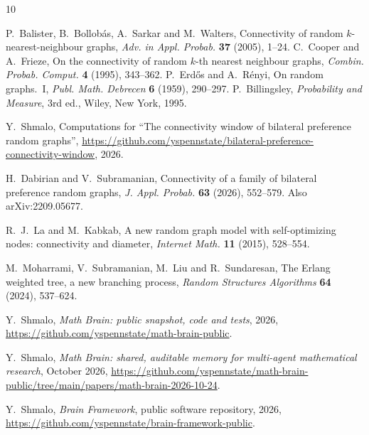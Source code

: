 \documentclass[11pt]{amsart}
\theoremstyle{remark}
\numberwithin{equation}{section}
\newcommand{\1}{\mathbf 1}
\begin{document}
\begin{thebibliography}{10}

P.~Balister, B.~Bollob\'as, A.~Sarkar and M.~Walters, Connectivity of random $k$-nearest-neighbour graphs, \emph{Adv. in Appl. Probab.} \textbf{37} (2005), 1--24.
C.~Cooper and A.~Frieze, On the connectivity of random $k$-th nearest neighbour graphs, \emph{Combin. Probab. Comput.} \textbf{4} (1995), 343--362.
P.~Erd\H{o}s and A.~R\'enyi, On random graphs.~I, \emph{Publ. Math. Debrecen} \textbf{6} (1959), 290--297.
P.~Billingsley, \emph{Probability and Measure}, 3rd ed., Wiley, New York, 1995.

Y.~Shmalo, Computations for ``The connectivity window of bilateral preference random graphs'', \url{https://github.com/yspennstate/bilateral-preference-connectivity-window}, 2026.

H.~Dabirian and V.~Subramanian, Connectivity of a family of bilateral preference random graphs, \emph{J. Appl. Probab.} \textbf{63} (2026), 552--579. Also arXiv:2209.05677.

R.~J.~La and M.~Kabkab, A new random graph model with self-optimizing nodes: connectivity and diameter, \emph{Internet Math.} \textbf{11} (2015), 528--554.

M.~Moharrami, V.~Subramanian, M.~Liu and R.~Sundaresan, The Erlang weighted tree, a new branching process, \emph{Random Structures Algorithms} \textbf{64} (2024), 537--624.

 Y.~Shmalo, \emph{Math Brain: public snapshot, code and tests}, 2026, \url{https://github.com/yspennstate/math-brain-public}.

 Y.~Shmalo, \emph{Math Brain: shared, auditable memory for multi-agent mathematical research}, October 2026, \url{https://github.com/yspennstate/math-brain-public/tree/main/papers/math-brain-2026-10-24}.

 Y.~Shmalo, \emph{Brain Framework}, public software repository, 2026, \url{https://github.com/yspennstate/brain-framework-public}.

\end{thebibliography}
\end{document}
